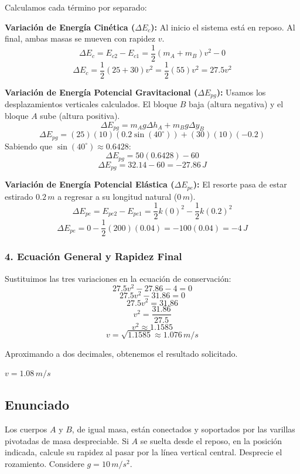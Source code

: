 \documentclass[12pt, a4paper]{article}
\begin{document}
Calculamos cada término por separado:

\textbf{Variación de Energía Cinética ($\Delta E_c$):}
Al inicio el sistema está en reposo. Al final, ambas masas se mueven con rapidez $v$.
$$ \Delta E_c = E_{c2} - E_{c1} = \frac{1}{2} (m_A + m_B) v^2 - 0 $$
$$ \Delta E_c = \frac{1}{2} (25 + 30) v^2 = \frac{1}{2} (55) v^2 = 27.5 v^2 $$

\textbf{Variación de Energía Potencial Gravitacional ($\Delta E_{pg}$):}
Usamos los desplazamientos verticales calculados. El bloque $B$ baja (altura negativa) y el bloque $A$ sube (altura positiva).
$$ \Delta E_{pg} = m_A g \Delta h_A + m_B g \Delta y_B $$
$$ \Delta E_{pg} = (25)(10)(0.2 \sin(40^\circ)) + (30)(10)(-0.2) $$
Sabiendo que $\sin(40^\circ) \approx 0.6428$:
$$ \Delta E_{pg} = 50(0.6428) - 60 $$
$$ \Delta E_{pg} = 32.14 - 60 = -27.86 \, \si{J} $$

\textbf{Variación de Energía Potencial Elástica ($\Delta E_{pe}$):}
El resorte pasa de estar estirado $0.2 \, \si{m}$ a regresar a su longitud natural ($0 \, \si{m}$).
$$ \Delta E_{pe} = E_{pe2} - E_{pe1} = \frac{1}{2} k (0)^2 - \frac{1}{2} k (0.2)^2 $$
$$ \Delta E_{pe} = 0 - \frac{1}{2} (200) (0.04) = -100(0.04) = -4 \, \si{J} $$

\subsubsection*{4. Ecuación General y Rapidez Final}
Sustituimos las tres variaciones en la ecuación de conservación:
$$ 27.5 v^2 - 27.86 - 4 = 0 $$
$$ 27.5 v^2 - 31.86 = 0 $$
$$ 27.5 v^2 = 31.86 $$
$$ v^2 = \frac{31.86}{27.5} $$
$$ v^2 \approx 1.1585 $$
$$ v = \sqrt{1.1585} \approx 1.076 \, \si{m/s} $$

Aproximando a dos decimales, obtenemos el resultado solicitado.

\begin{tcolorbox}[colback=green!5!white, colframe=green!50!black, title=Respuesta Final]
\centering \Large $v = 1.08 \, \si{m/s}$
\end{tcolorbox}

\newpage

\subsection*{Enunciado}
Los cuerpos $A$ y $B$, de igual masa, están conectados y soportados por las varillas pivotadas de masa despreciable. Si $A$ se suelta desde el reposo, en la posición indicada, calcule su rapidez al pasar por la línea vertical central. Desprecie el rozamiento. Considere $g = 10 \, \si{m/s^2}$.
\end{document}
